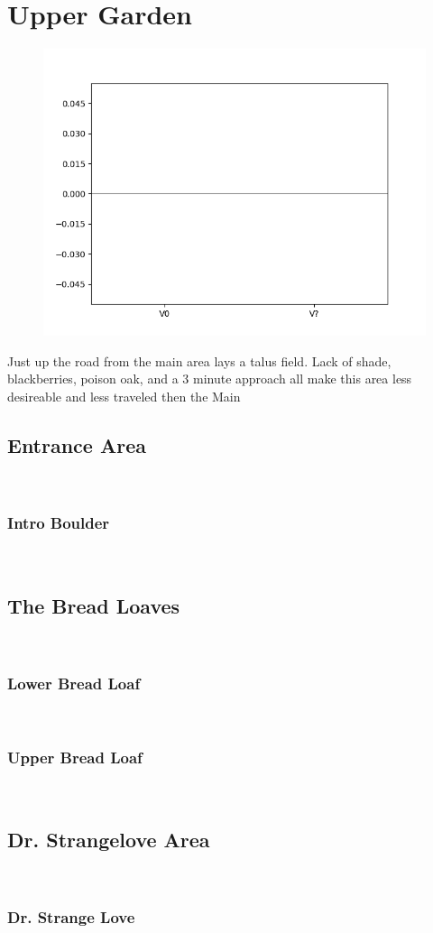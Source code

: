 \chapter{Upper Garden}\label{a:Upper Garden}
\lhead{\textcolor{\chapterColor}{\rule[-2pt]{\textwidth}{15pt}}}
\begin{figure}[h]
  \centering
    \includegraphics[width=\linewidth]{./maps/plots/Upper Garden.png}
\end{figure}
Just up the road from the main area lays a talus field. Lack of shade, blackberries, poison oak, and a 3 minute approach all make this area less desireable and less traveled then the Main

\section{Entrance Area}\label{sa:Entrance Area}
\

\subsection*{Intro Boulder}\label{bf:Intro Boulder}
\

\section{The Bread Loaves}\label{sa:The Bread Loaves}
\

\subsection*{Lower Bread Loaf}\label{bf:Lower Bread Loaf}
\

\subsection*{Upper Bread Loaf}\label{bf:Upper Bread Loaf}
\

\section{Dr. Strangelove Area}\label{sa:Dr. Strangelove Area}
\

\subsection*{Dr. Strange Love}\label{bf:Dr. Strange Love}
\

\clearpage